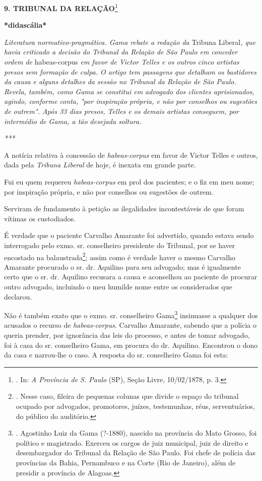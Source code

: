 \textbf{9. TRIBUNAL DA RELAÇÃO}\footnote{. In: \emph{A Província de S.
  Paulo} (SP), Seção Livre, 10/02/1878, p. 3.}

\textbf{*didascália*}

\emph{Literatura normativo-pragmática. Gama rebate a redação da} Tribuna
Liberal\emph{, que havia criticado a decisão do Tribunal da Relação de
São Paulo em conceder ordem de} habeas-corpus \emph{em favor de Victor
Telles e os outros cinco artistas presos sem formação de culpa. O artigo
tem passagens que detalham os bastidores da causa e alguns detalhes da
sessão no Tribunal da Relação de São Paulo. Revela, também, como Gama se
constitui em advogado dos clientes aprisionados, agindo, conforme conta,
"por inspiração própria, e não por conselhos ou sugestões de outrem".
Após 33 dias presos, Telles e os demais artistas conseguem, por
intermédio de Gama, a tão desejada soltura. }

\emph{***}

A notícia relativa à concessão de \emph{habeas-corpus} em favor de
Victor Telles e outros, dada pela \emph{Tribuna Liberal} de hoje, é
inexata em grande parte.

Fui eu quem requereu \emph{habeas-corpus} em prol dos pacientes; e o fiz
em meu nome; por inspiração própria, e não por conselhos ou sugestões de
outrem.

Serviram de fundamento à petição as ilegalidades incontestáveis de que
foram vítimas os custodiados.

É verdade que o paciente Carvalho Amarante foi advertido, quando estava
sendo interrogado pelo exmo. sr. conselheiro presidente do Tribunal, por
se haver encostado na balaustrada\footnote{. Nesse caso, fileira de
  pequenas colunas que divide o espaço do tribunal ocupado por
  advogados, promotores, juízes, testemunhas, réus, serventuários, do
  público do auditório.}; assim como é verdade haver o mesmo Carvalho
Amarante procurado o sr. dr. Aquilino para seu advogado; mas é
igualmente certo que o sr. dr. Aquilino recusara a causa e aconselhou ao
paciente de procurar outro advogado, incluindo o meu humilde nome entre
os considerados que declarou.

Não é também exato que o exmo. sr. conselheiro Gama\footnote{. Agostinho
  Luiz da Gama (?-1880), nascido na província do Mato Grosso, foi
  político e magistrado. Exerceu os cargos de juiz municipal, juiz de
  direito e desembargador do Tribunal da Relação de São Paulo. Foi chefe
  de polícia das províncias da Bahia, Pernambuco e na Corte (Rio de
  Janeiro), além de presidir a província de Alagoas.} insinuasse a
qualquer dos acusados o recurso de \emph{habeas-corpus}. Carvalho
Amarante, sabendo que a polícia o queria prender, por ignorância das
leis do processo, e antes de tomar advogado, foi à casa do sr.
conselheiro Gama, em procura do dr. Aquilino. Encontrou o dono da casa e
narrou-lhe o caso. A resposta do sr. conselheiro Gama foi esta:

